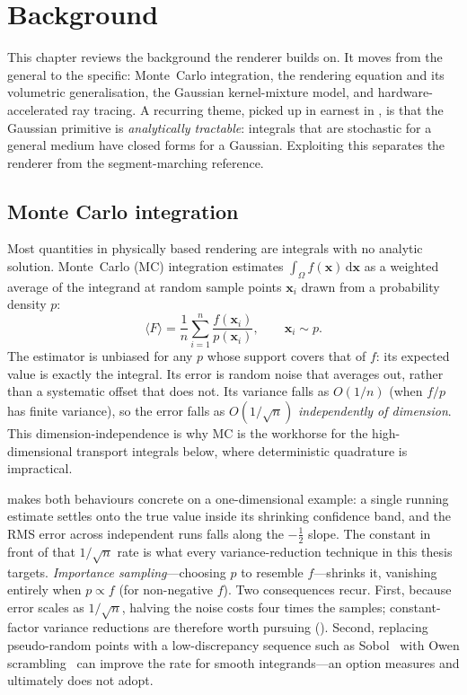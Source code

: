 \chapter{Background}
\label{ch:background}

This chapter reviews the background the renderer builds on. It moves from the general to the
specific: Monte~Carlo integration, the rendering equation and its
volumetric generalisation, the Gaussian kernel-mixture model, and hardware-accelerated
ray tracing. A recurring theme, picked up
in earnest in , is that the Gaussian primitive is \emph{analytically
tractable}: integrals that are stochastic for a general medium have closed forms for a Gaussian.
Exploiting this separates the renderer from the segment-marching reference.

\section{Monte Carlo integration}
\label{sec:monte-carlo}

Most quantities in physically based rendering are integrals with no analytic solution. Monte~Carlo
(MC) integration estimates $\int_{\Omega} f(\bm{x})\,\mathrm{d}\bm{x}$ as a weighted average of the
integrand at random sample points $\bm{x}_i$ drawn from a probability density $p$:
\[
  \langle F \rangle = \frac{1}{n}\sum_{i=1}^{n} \frac{f(\bm{x}_i)}{p(\bm{x}_i)},
  \qquad \bm{x}_i \sim p .
\]
The estimator is unbiased for any $p$ whose support covers that of $f$: its expected value is
exactly the integral. Its error is random noise that averages out, rather than a systematic offset
that does not. Its variance falls as $O(1/n)$ (when $f/p$ has finite variance), so the error falls as $O(1/\sqrt{n})$ \emph{independently of
dimension}. This dimension-independence is why MC is the workhorse for the high-dimensional
transport integrals below, where deterministic quadrature is impractical.

 makes both behaviours concrete on a one-dimensional example: a single running
estimate settles onto the true value inside its shrinking confidence band, and the RMS error across
independent runs falls along the $-\tfrac12$ slope. The constant in front of that $1/\sqrt{n}$ rate is
what every variance-reduction technique in this
thesis targets. \emph{Importance sampling}---choosing $p$ to resemble $f$---shrinks it, vanishing
entirely when $p \propto f$ (for non-negative $f$). Two consequences recur. First, because error scales as $1/\sqrt{n}$,
halving the noise costs four times the samples; constant-factor variance reductions are therefore
worth pursuing (). Second, replacing pseudo-random points with a
low-discrepancy sequence such as Sobol~\cite{Sobol1967} with Owen scrambling~\cite{Owen1998} can
improve the rate for smooth integrands---an option  measures and ultimately
does not adopt.

